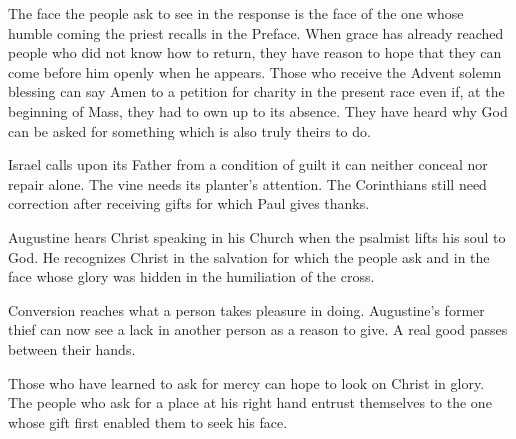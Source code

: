 The face the people ask to see in the response is the face of the one whose humble coming the priest recalls in the Preface. When grace has already reached people who did not know how to return, they have reason to hope that they can come before him openly when he appears. Those who receive the Advent solemn blessing can say Amen to a petition for charity in the present race even if, at the beginning of Mass, they had to own up to its absence. They have heard why God can be asked for something which is also truly theirs to do.

\begin{fourSenses}
\item[Literal.] Israel calls upon its Father from a condition of guilt it can neither conceal nor repair alone. The vine needs its planter's attention. The Corinthians still need correction after receiving gifts for which Paul gives thanks.
\item[Allegorical.] Augustine hears Christ speaking in his Church when the psalmist lifts his soul to God. He recognizes Christ in the salvation for which the people ask and in the face whose glory was hidden in the humiliation of the cross.
\item[Moral.] Conversion reaches what a person takes pleasure in doing. Augustine's former thief can now see a lack in another person as a reason to give. A real good passes between their hands.
\item[Anagogical.] Those who have learned to ask for mercy can hope to look on Christ in glory. The people who ask for a place at his right hand entrust themselves to the one whose gift first enabled them to seek his face.
\end{fourSenses}
